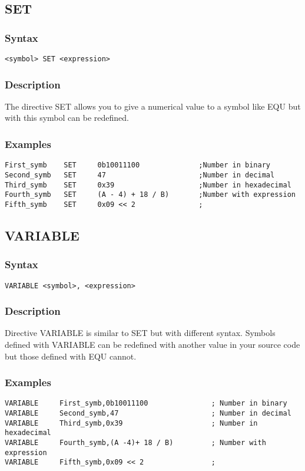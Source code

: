     \subsection{SET}
        \subsubsection{Syntax}
            \verb'<symbol> SET <expression>'

        \subsubsection{Description}
            The directive SET allows you to give a numerical value to a symbol like EQU but with this symbol can be redefined.

        \subsubsection{Examples}
            \verb'First_symb    SET     0b10011100              ;Number in binary'\\
            \verb'Second_symb   SET     47                      ;Number in decimal'\\
            \verb'Third_symb    SET     0x39                    ;Number in hexadecimal'\\
            \verb'Fourth_symb   SET     (A - 4) + 18 / B)       ;Number with expression'\\
            \verb'Fifth_symb    SET     0x09 << 2               ;'

    \subsection{VARIABLE}
        \subsubsection{Syntax}
            \verb'VARIABLE <symbol>, <expression>'

        \subsubsection{Description}
            Directive VARIABLE is similar to SET but with different syntax. Symbols defined with VARIABLE can be redefined with another value in your source code but those defined with EQU cannot.

        \subsubsection{Examples}
            \verb'VARIABLE     First_symb,0b10011100               ; Number in binary'\\
            \verb'VARIABLE     Second_symb,47                      ; Number in decimal'\\
            \verb'VARIABLE     Third_symb,0x39                     ; Number in hexadecimal'\\
            \verb'VARIABLE     Fourth_symb,(A -4)+ 18 / B)         ; Number with expression'\\
            \verb'VARIABLE     Fifth_symb,0x09 << 2                ;'

